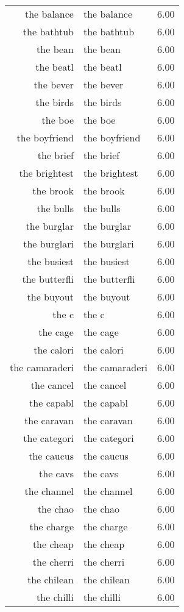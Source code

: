 \begin{table}[ht]
\begin{tabular}{rlr}
  the balance & the balance & 6.00 \\ 
  the bathtub & the bathtub & 6.00 \\ 
  the bean & the bean & 6.00 \\ 
  the beatl & the beatl & 6.00 \\ 
  the bever & the bever & 6.00 \\ 
  the birds & the birds & 6.00 \\ 
  the boe & the boe & 6.00 \\ 
  the boyfriend & the boyfriend & 6.00 \\ 
  the brief & the brief & 6.00 \\ 
  the brightest & the brightest & 6.00 \\ 
  the brook & the brook & 6.00 \\ 
  the bulls & the bulls & 6.00 \\ 
  the burglar & the burglar & 6.00 \\ 
  the burglari & the burglari & 6.00 \\ 
  the busiest & the busiest & 6.00 \\ 
  the butterfli & the butterfli & 6.00 \\ 
  the buyout & the buyout & 6.00 \\ 
  the c & the c & 6.00 \\ 
  the cage & the cage & 6.00 \\ 
  the calori & the calori & 6.00 \\ 
  the camaraderi & the camaraderi & 6.00 \\ 
  the cancel & the cancel & 6.00 \\ 
  the capabl & the capabl & 6.00 \\ 
  the caravan & the caravan & 6.00 \\ 
  the categori & the categori & 6.00 \\ 
  the caucus & the caucus & 6.00 \\ 
  the cavs & the cavs & 6.00 \\ 
  the channel & the channel & 6.00 \\ 
  the chao & the chao & 6.00 \\ 
  the charge & the charge & 6.00 \\ 
  the cheap & the cheap & 6.00 \\ 
  the cherri & the cherri & 6.00 \\ 
  the chilean & the chilean & 6.00 \\ 
  the chilli & the chilli & 6.00 \\ 

\end{tabular}
\end{table}
